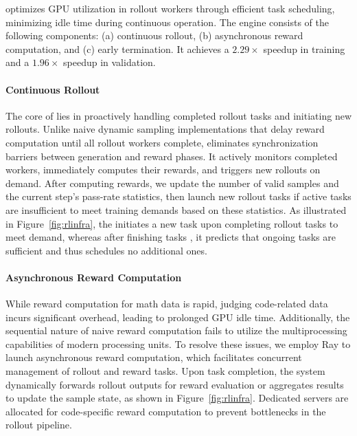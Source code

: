 \rlsys{} optimizes GPU utilization in rollout workers through efficient task scheduling, minimizing idle time during continuous operation.
%
The engine consists of the following components: (a) continuous rollout, (b) asynchronous reward computation, and (c) early termination.
%
It achieves a $2.29\times$ speedup in training and a $1.96\times$ speedup in validation.

\paragraph{Continuous Rollout}
%
The core of \rlsys{} lies in proactively handling completed rollout tasks and initiating new rollouts.
%
Unlike naive dynamic sampling implementations that delay reward computation until all rollout workers complete, \rlsys{} eliminates synchronization barriers between generation and reward phases.
%
It actively monitors completed workers, immediately computes their rewards, and triggers new rollouts on demand.
%
After computing rewards, we update the number of valid samples and the current step's pass-rate statistics, then launch new rollout tasks if active tasks are insufficient to meet training demands based on these statistics.
%
As illustrated in Figure~\ref{fig:rlinfra}, the \rlsys{} initiates a new task upon completing rollout tasks  to meet demand, whereas after finishing tasks , it predicts that ongoing tasks are sufficient and thus schedules no additional ones.


\paragraph{Asynchronous Reward Computation}
%
While reward computation for math data is rapid, judging code-related data incurs significant overhead, leading to prolonged GPU idle time. 
%
Additionally, the sequential nature of naive reward computation fails to utilize the multiprocessing capabilities of modern processing units. 
%
To resolve these issues, we employ Ray to launch asynchronous reward computation, which facilitates concurrent management of rollout and reward tasks.
%
Upon task completion, the system dynamically forwards rollout outputs for reward evaluation or aggregates results to update the sample state, as shown in Figure~\ref{fig:rlinfra}.
%
Dedicated servers are allocated for code-specific reward computation to prevent bottlenecks in the rollout pipeline. 
%


